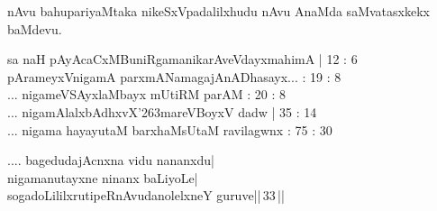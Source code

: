 \begin{entry}
\end{entry}

\begin{entry}
\begin{shl}
nAvu bahupariyaMtaka nikeSxVpadalilxhudu nAvu AnaMda saMvatasxkekx baMdevu.
\end{shl}
\end{entry}

\begin{entry}
\gl{}
\info{}{}{}{}
\begin{shl}
sa naH pAyAcaCxMBuniRgamanikarAveVdayxmahimA | 12 : 6\\
pArameyxVnigamA parxmANamagajAnADhasayx... : 19 : 8\\
... nigameVSAyxlaMbayx mUtiRM parAM : 20 : 8\\
... nigamAlalxbAdhxvX\char'263mareVBoyxV dadw | 35 : 14\\
... nigama hayayutaM barxhaMsUtaM ravilagwnx : 75 : 30
\end{shl}

\begin{shl}
.... bagedudajAcnxna vidu nananxdu|\\
nigamanutayxne ninanx baLiyoLe|\\
sogadoLililxrutipeRnAvudanolelxneY guruve||\,33\,||
\end{shl}
\end{entry}

